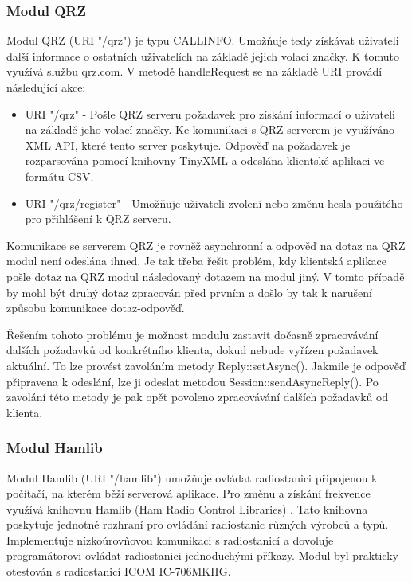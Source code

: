 \subsubsection{Modul QRZ}

Modul QRZ (URI "/qrz") je typu CALLINFO. Umožňuje tedy získávat uživateli další informace o ostatních uživatelích na základě jejich
volací značky. K tomuto využívá službu qrz.com. V metodě handleRequest se na základě URI provádí následující akce:

\begin{itemize}
\item URI "/qrz" - Pošle QRZ serveru požadavek pro získání informací o uživateli na základě jeho volací značky. Ke komunikaci 
s QRZ serverem je využíváno XML API, které tento server poskytuje. Odpověď na požadavek je rozparsována pomocí knihovny 
TinyXML a odeslána klientské aplikaci ve formátu CSV.
\item URI "/qrz/register" - Umožňuje uživateli zvolení nebo změnu hesla použitého pro přihlášení k QRZ serveru.
\end{itemize}

Komunikace se serverem QRZ je rovněž asynchronní a odpověď na dotaz na QRZ modul není odeslána ihned.
Je tak třeba řešit problém, kdy klientská aplikace pošle dotaz na QRZ modul
následovaný dotazem na modul jiný. V tomto případě by mohl být druhý dotaz zpracován před prvním a došlo by tak k narušení
způsobu komunikace dotaz-odpověď.

Řešením tohoto problému je možnost modulu zastavit dočasně zpracovávání dalších požadavků od konkrétního klienta, dokud 
nebude vyřízen požadavek aktuální. To lze provést zavoláním metody Reply::setAsync(). Jakmile je odpověď připravena
k odeslání, lze ji odeslat metodou Session::sendAsyncReply(). Po zavolání této metody je pak opět povoleno zpracovávání
dalších požadavků od klienta.

\subsubsection{Modul Hamlib}

Modul Hamlib (URI "/hamlib") umožňuje ovládat radiostanici připojenou k
počítačí, na kterém běží serverová aplikace.
Pro změnu a získání frekvence využívá knihovnu Hamlib (Ham Radio Control Libraries) \cite{hamlib}.
Tato knihovna poskytuje jednotné rozhraní pro ovládání radiostanic různých výrobců a typů.
Implementuje nízkoúrovňovou komunikaci s radiostanicí a dovoluje programátorovi ovládat 
radiostanici jednoduchými příkazy.
Modul byl prakticky otestován s radiostanicí ICOM IC-706MKIIG.

